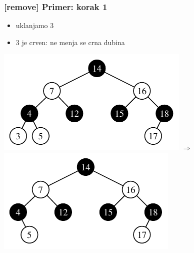 \documentclass[compress]{beamer}
\begin{document}
\begin{frame}[fragile]
  \frametitle{[remove] Primer: korak 1}
  \begin{itemize}
    \item uklanjamo 3
    \item 3 je crven: ne menja se crna dubina
  \end{itemize}
  \begin{center}
    \includegraphics[scale=0.8]{asp-11-del-01.pdf} $\Rightarrow$
    \includegraphics[scale=0.8]{asp-11-del-02.pdf}
  \end{center}
\end{frame}
\end{document}
